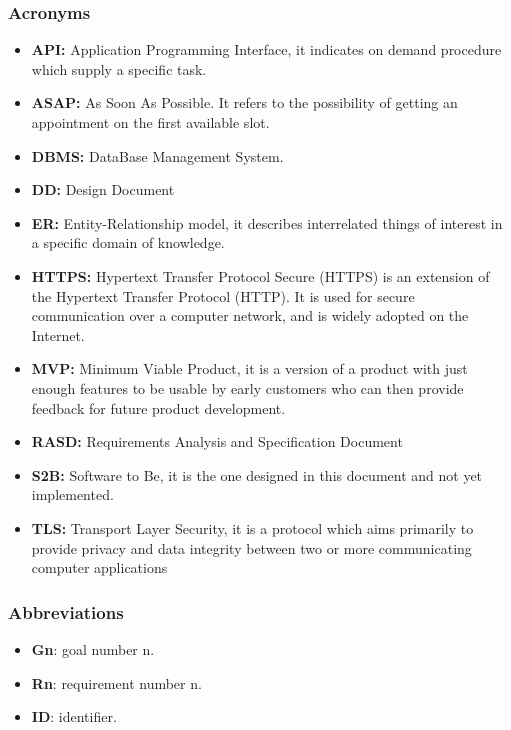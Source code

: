 \documentclass[table, 12pt]{article}
\begin{document}
\subsubsection{Acronyms}
\begin{itemize}
    \item \textbf{API:} Application Programming Interface, it indicates on demand procedure which supply a specific task.
    \item \textbf{ASAP:} As Soon As Possible. It refers to the possibility of getting an appointment on the first available slot.
    \item \textbf{DBMS:} DataBase Management System.
    \item \textbf{DD:} Design Document
    \item \textbf{ER:} Entity-Relationship model, it describes interrelated things of interest in a specific domain of knowledge.
    \item \textbf{HTTPS:} Hypertext Transfer Protocol Secure (HTTPS) is an extension of the Hypertext Transfer Protocol (HTTP). It is used for secure communication over a computer network, and is widely adopted on the Internet.
    \item \textbf{MVP:} Minimum Viable Product, it is a version of a product with just enough features to be usable by early customers who can then provide feedback for future product development.
    \item \textbf{RASD:} Requirements Analysis and Specification Document
    \item \textbf{S2B:} Software to Be, it is the one designed in this document and not yet implemented.
    \item \textbf{TLS:} Transport Layer Security, it is a protocol which aims primarily to provide privacy and data integrity between two or more communicating computer applications
\end{itemize}

\subsubsection{Abbreviations}
\begin{itemize}
    \item \textbf{Gn}: goal number n.
    \item \textbf{Rn}: requirement number n.
    \item \textbf{ID}: identifier.
\end{itemize}
\end{document}
